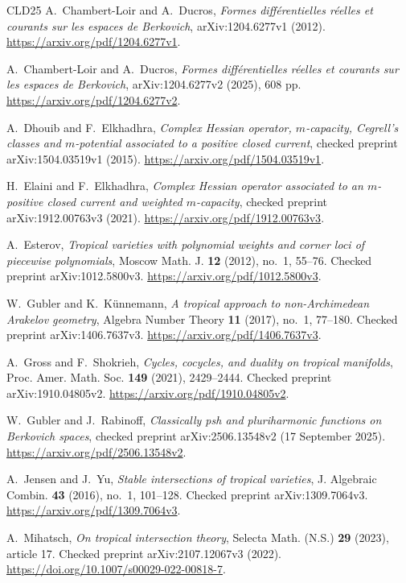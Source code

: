 \documentclass[11pt,a4paper]{article}
\numberwithin{equation}{section}
\theoremstyle{definition}
\theoremstyle{remark}
\begin{document}
\begin{thebibliography}{CLD25}
A.~Chambert-Loir and A.~Ducros,
\emph{Formes diff\'erentielles r\'eelles et courants sur les espaces
de Berkovich}, arXiv:1204.6277v1 (2012).
\url{https://arxiv.org/pdf/1204.6277v1}.

A.~Chambert-Loir and A.~Ducros,
\emph{Formes diff\'erentielles r\'eelles et courants sur les espaces
de Berkovich}, arXiv:1204.6277v2 (2025), 608 pp.
\url{https://arxiv.org/pdf/1204.6277v2}.

A.~Dhouib and F.~Elkhadhra,
\emph{Complex Hessian operator, $m$-capacity, Cegrell's classes
and $m$-potential associated to a positive closed current},
checked preprint arXiv:1504.03519v1 (2015).
\url{https://arxiv.org/pdf/1504.03519v1}.

H.~Elaini and F.~Elkhadhra,
\emph{Complex Hessian operator associated to an $m$-positive
closed current and weighted $m$-capacity},
checked preprint arXiv:1912.00763v3 (2021).
\url{https://arxiv.org/pdf/1912.00763v3}.

A.~Esterov,
\emph{Tropical varieties with polynomial weights and corner loci
of piecewise polynomials}, Moscow Math. J. \textbf{12} (2012),
no.~1, 55--76. Checked preprint arXiv:1012.5800v3.
\url{https://arxiv.org/pdf/1012.5800v3}.

W.~Gubler and K.~K\"unnemann,
\emph{A tropical approach to non-Archimedean Arakelov geometry},
Algebra Number Theory \textbf{11} (2017), no.~1, 77--180.
Checked preprint arXiv:1406.7637v3.
\url{https://arxiv.org/pdf/1406.7637v3}.

A.~Gross and F.~Shokrieh,
\emph{Cycles, cocycles, and duality on tropical manifolds},
Proc. Amer. Math. Soc. \textbf{149} (2021), 2429--2444.
Checked preprint arXiv:1910.04805v2.
\url{https://arxiv.org/pdf/1910.04805v2}.

W.~Gubler and J.~Rabinoff,
\emph{Classically psh and pluriharmonic functions on Berkovich spaces},
checked preprint arXiv:2506.13548v2 (17 September 2025).
\url{https://arxiv.org/pdf/2506.13548v2}.

A.~Jensen and J.~Yu,
\emph{Stable intersections of tropical varieties},
J. Algebraic Combin. \textbf{43} (2016), no.~1, 101--128.
Checked preprint arXiv:1309.7064v3.
\url{https://arxiv.org/pdf/1309.7064v3}.

A.~Mihatsch, \emph{On tropical intersection theory},
Selecta Math. (N.S.) \textbf{29} (2023), article 17.
Checked preprint arXiv:2107.12067v3 (2022).
\url{https://doi.org/10.1007/s00029-022-00818-7}.


\end{thebibliography}
\end{document}
